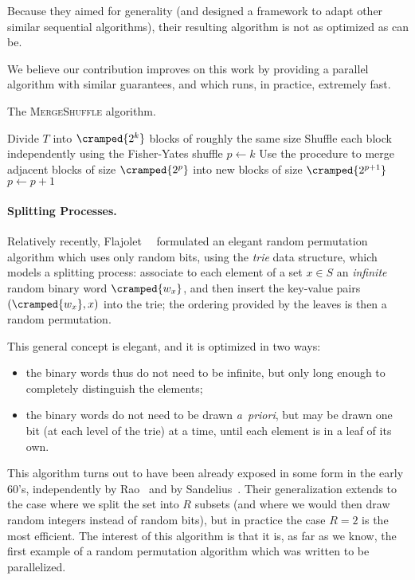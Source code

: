 \documentclass[letter,11pt,en]{quick-document}
\begin{document}
Because they aimed for generality (and designed a framework to adapt other
similar sequential algorithms), their resulting algorithm is not as
optimized as can be.

We believe our contribution improves on this work by providing a parallel
algorithm with similar guarantees, and which runs, in practice, extremely
fast.


\begin{algorithm}
\caption{The \textsc{MergeShuffle}{} algorithm.\label{alg-mergeshuffle}}
\begin{algorithmic}[1]
\State Divide $T$ into $\cramped{2^k}$ blocks of roughly the same size
\State Shuffle each block independently using the Fisher-Yates shuffle
\State $p \gets k$
\Repeat
  \State Use the  procedure to merge adjacent blocks of size
  $\cramped{2^p}$ into new blocks of size $\cramped{2^{p+1}}$
  \State $p \gets p + 1$
\EndProcedure
\end{algorithmic}
\end{algorithm}


\paragraph{Splitting Processes.} Relatively recently,
Flajolet~\etal~\cite{FlPeSo11} formulated an elegant random permutation
algorithm which uses only random bits, using the \emph{trie} data
structure, which models a splitting process: associate to each element of
a set $x\in S$ an \emph{infinite} random binary word $\cramped{w_x}$, and
then insert the key-value pairs $(\cramped{w_x}, x)$ into the trie; the
ordering provided by the leaves is then a random permutation.

This general concept is elegant, and it is optimized in two ways:
\begin{itemize}[noitemsep]
\item the binary words thus do not need to be infinite, but only long
  enough to completely distinguish the elements;
\item the binary words do not need to be drawn \emph{a~priori}, but may be
  drawn one bit (at each level of the trie) at a time, until each element
  is in a leaf of its own.
\end{itemize}
This algorithm turns out to have been already exposed in some form in the
early 60's, independently by Rao~\cite{Rao61} and by
Sandelius~\cite{Sandelius62}. Their generalization extends to the case
where we split the set into $R$ subsets (and where we would then draw
random integers instead of random bits), but in practice the case $R=2$ is
the most efficient. The interest of this algorithm is that it is, as far
as we know, the first example of a random permutation algorithm which was
written to be parallelized.
\end{document}
